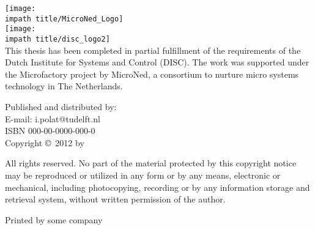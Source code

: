 
\noindent
\texttt{[image: \\impath title/MicroNed\_Logo]}\hspace*{0.75cm}\\[2em]
\texttt{[image: \\impath title/disc\_logo2]}\hspace*{0.75cm}\\[1em]

\noindent This thesis has been completed in partial fulfillment of
the requirements of the Dutch Institute for Systems and Control
(DISC). The work was supported under the Microfactory project by
MicroNed, a consortium to nurture micro systems technology in
The Netherlands.

\vspace*{\fill}


\noindent Published and distributed by: \theauthor \\
E-mail: i.polat@tudelft.nl\\

\bigskip{}
\noindent ISBN 000-00-0000-000-0\\
\noindent Copyright \copyright~2012 by \theauthor



\bigskip{}
\noindent All rights reserved. No part of the material protected by
this copyright notice may be reproduced or utilized in any form or
by any means, electronic or mechanical, including photocopying,
recording or by any information storage and retrieval system,
without written permission of the author.

\bigskip{}

\noindent Printed by some company
